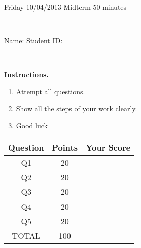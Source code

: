 \documentclass[12pt, oneside]{amsart}
\newcommand{\one}{20}
\newcommand{\two}{20}
\newcommand{\three}{20}
\newcommand{\four}{20}
\newcommand{\five}{20}
\begin{document}
%

\begin{center}
    \hrulefill\\
    {\bf \textsf{\raisebox{-0.10cm}{Fall 2013: MATH 163} \hspace{\fill} 
            \raisebox{-0.10cm}{Ordinary Differential Equations} \hspace{\fill}
            \raisebox{-0.10cm}{David Karapetyan}}}\\
    \hrulefill\\
    {\large \rule{0cm}{1.2cm} \textsf{Friday 10/04/2013} \hfill
        \textsf{Midterm} \hfill  \textsf{50 minutes}}\\
    {\large\rule{0cm}{1.2cm}\textsf{Name: \framebox[2.9in]{\rule{0cm}{0.8cm}} 
            \hspace{\fill}
            Student ID: \framebox[2.1in]{\rule{0cm}{0.8cm}}}}\\
\end{center}
\vspace{0.8cm}

\noindent
{\bf \textsf{Instructions.}}

\begin{enumerate}
    \item Attempt all questions.   
    \item Show all the steps of your work clearly.  
    \item Good luck 
\end{enumerate}

\vfill


\begin{center}
    {\large
        \begin{tabular}{|c|c|c|}
            \hline
            \rule[-0.3cm]{0cm}{1cm}
            \textsf{Question} & \textsf{Points} &  \textsf{Your Score} \\
            \hline
            \hline
            \rule[-0.3cm]{0cm}{1cm}
            \textsf{Q1} & \one &\\
            \hline
            \rule[-0.3cm]{0cm}{1cm}
            \textsf{Q2} & \two &\\
            \hline
            \rule[-0.3cm]{0cm}{1cm}
            \textsf{Q3} & \three &\\
            \hline
            \rule[-0.3cm]{0cm}{1cm}
            \textsf{Q4} & \four &\\
            \hline
            \rule[-0.3cm]{0cm}{1cm}
            \textsf{Q5} & \five &\\
            \hline
            \rule[-0.3cm]{0cm}{1cm}

            \textsf{TOTAL} & 100 & \\
            \hline
        \end{tabular}
    } 

\end{center}
\end{document}
